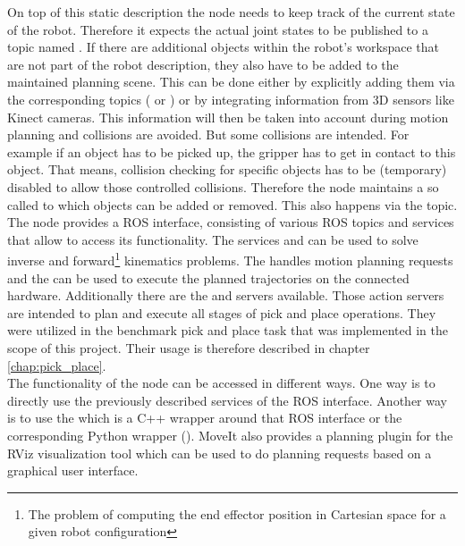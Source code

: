 On top of this static description the  node needs to keep track of the current state of the robot. Therefore it expects the actual joint states to be published to a topic named . If there are additional objects within the robot's workspace that are not part of the robot description, they also have to be added to the maintained planning scene. This can be done either by explicitly adding them via the corresponding topics ( or ) or by integrating information from 3D sensors like Kinect cameras. This information will then be taken into account during motion planning and collisions are avoided. But some collisions are intended. For example if an object has to be picked up, the gripper has to get in contact to this object. That means, collision checking for specific objects has to be (temporary) disabled to allow those controlled collisions. Therefore the  node maintains a so called  to which objects can be added or removed. This also happens via the  topic. \\

The  node provides a ROS interface, consisting of various ROS topics and services that allow to access its functionality. The services  and  can be used to solve inverse and forward\footnote{The problem of computing the end effector position in Cartesian space for a given robot configuration} kinematics problems. The  handles motion planning requests and the  can be used to execute the planned trajectories on the connected hardware. Additionally there are the  and  servers available. Those action servers are intended to plan and execute all stages of pick and place operations. They were utilized in the benchmark pick and place task that was implemented in the scope of this project. Their usage is therefore described in chapter \ref{chap:pick_place}. \\

The functionality of the  node can be accessed in different ways. One way is to directly use the previously described services of the ROS interface. Another way is to use the  which is a C++ wrapper around that ROS interface or the corresponding Python wrapper (). MoveIt also provides a planning plugin for the RViz visualization tool which can be used to do planning requests based on a graphical user interface. \\

